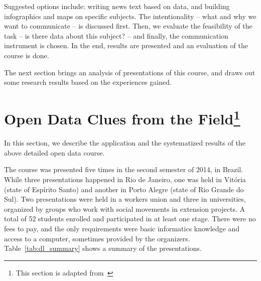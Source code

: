 Suggested options include: writing news text based on data, and building infographics and maps on specific subjects. The intentionality – what and why we want to communicate – is discussed first. Then, we evaluate the feasibility of the task – is there data about this subject? – and finally, the communication instrument is chosen. In the end, results are presented and an evaluation of the course is done.

The next section brings an analysis of presentations of this course, and draws out some research results based on the experiences gained.

\section[Open Data Clues from the Field]{Open Data Clues from the Field\footnote{This section is adapted from~}}

\label{dl_results} 

In this section, we describe the application and the systematized results of the above detailed open data course.

The course was presented five times in the second semester of 2014, in Brazil. While three presentations happened in Rio de Janeiro, one was held in Vitória (state of Espírito Santo) and another in Porto Alegre (state of Rio Grande do Sul). Two presentations were held in a workers union and three in universities, organized by groups who work with social movements in extension projects. A total of 52 students enrolled and participated in at least one stage. There were no fees to pay, and the only requirements were basic informatics knowledge and access to a computer, sometimes provided by the organizers. Table~\ref{tab:dl_summary} shows a summary of the presentations.

